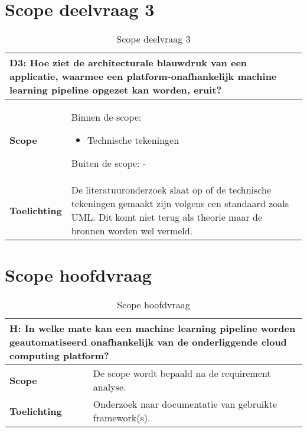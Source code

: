 \section{Scope deelvraag 3}\label{appendix:scope-subquestion-3}
\begin{table}[hbt!]
  \centering
  \begin{tabular}{|p{.215\linewidth}|p{.72\linewidth}|}
  \hline
  \multicolumn{2}{|p{.97\linewidth}|}{\textbf{D3: Hoe ziet de architecturale blauwdruk van een applicatie, waarmee een platform-onafhankelijk machine learning pipeline opgezet kan worden, eruit?}} \\ \hline
    \textbf{Scope}&
      Binnen de scope:
      \begin{itemize}
        \item Technische tekeningen
      \end{itemize}
      Buiten de scope:
      -
    \\ \hline
    \textbf{Toelichting}&
      De literatuuronderzoek slaat op of de technische tekeningen gemaakt zijn volgens een standaard zoals UML. Dit komt niet terug als theorie maar de bronnen worden wel vermeld.
    \\ \hline
  \end{tabular}
  \caption{Scope deelvraag 3}
  \label{table:scope-subquestion-3}
\end{table}

\newpage

\section{Scope hoofdvraag}\label{appendix:scope-main-question}
\begin{table}[hbt!]
  \centering
  \begin{tabular}{|p{.215\linewidth}|p{.72\linewidth}|}
  \hline
  \multicolumn{2}{|p{.97\linewidth}|}{\textbf{H: In welke mate kan een machine learning pipeline worden geautomatiseerd onafhankelijk van de onderliggende cloud computing platform?}} \\ \hline
    \textbf{Scope}&
      De scope wordt bepaald na de requirement analyse.
    \\ \hline
    \textbf{Toelichting}&
      Onderzoek naar documentatie van gebruikte framework(s).
    \\ \hline
  \end{tabular}
  \caption{Scope hoofdvraag}
  \label{table:scope-main-question}
\end{table}

